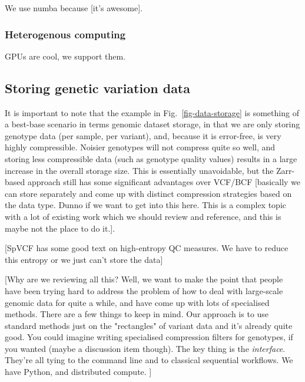 \documentclass[a4paper,num-refs]{oup-contemporary}
\begin{document}
We use numba because [it's awesome].

\subsubsection{Heterogenous computing}

GPUs are cool, we support them.


\subsection{Storing genetic variation data}

It is important to note that the example in Fig.~\ref{fig-data-storage}
is something of a best-base
scenario in terms genomic dataset storage, in that we are only
storing genotype data (per sample, per variant),
and, because it is error-free, is very
highly compressible. Noisier genotypes will not compress quite
so well, and storing less compressible data (such as genotype
quality values) results in a large increase in the overall
storage size. This is essentially unavoidable, but the Zarr-based
approach still has some significant advantages over VCF/BCF
[basically we can store separately and come up with distinct
compression strategies based on the data type. Dunno if we
want to get into this here. This is a complex topic with
a lot of existing work which we should review and reference,
and this is maybe not the place to do it.].

[SpVCF has some good text on high-entropy QC measures. We have to
reduce this entropy or we just can't store the data]


[Why are we reviewing all this? Well, we want to make the point
that people have been trying hard to address the problem of
how to deal with large-scale genomic data for quite a while,
and have come up with lots of specialised methods. There
are a few things to keep in mind. Our approach is to use
standard methods just on the "rectangles" of variant data
and it's already quite good. You could imagine writing specialised
compression filters for genotypes, if you wanted (maybe a
discussion item though). The key thing is the \emph{interface}.
They're all tying to the command line and to classical
sequential workflows. We have Python, and distributed compute. ]

\end{document}
